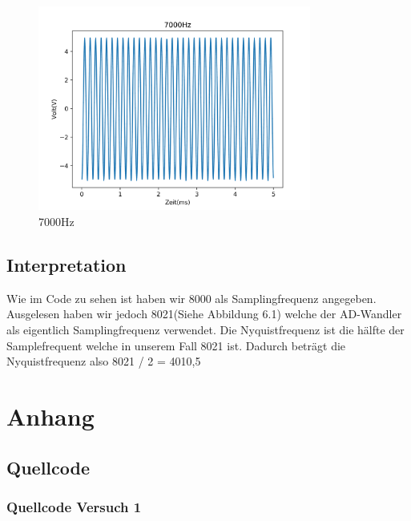 \documentclass[12pt, oneside, a4paper, \docLanguage]{report}
\begin{document}
\begin{figure}[H]
	\centering
	\includegraphics[width=0.8\textwidth]{../Images/7000Hz.png}
	\caption{7000Hz}
\end{figure}

\section{Interpretation}
\label{chap:VERSUCH_5_INTERPRETATION}
\begin{normalsize}
Wie im Code zu sehen ist haben wir 8000 als Samplingfrequenz angegeben. Ausgelesen haben wir jedoch 8021(Siehe Abbildung 6.1) welche der AD-Wandler als eigentlich Samplingfrequenz verwendet.
Die Nyquistfrequenz ist die hälfte der Samplefrequent welche in unserem Fall 8021 ist. Dadurch beträgt die Nyquistfrequenz also 8021 / 2 = 4010,5
\end{normalsize}
%
%
\renewcommand\thesection{A.\arabic{section}}
\renewcommand\thesubsection{\thesection.\arabic{subsection}}

\chapter*{Anhang}
\label{chap:APPENDIX}
\setcounter{chapter}{0}
\addtocounter{chapter}{1}
\setcounter{section}{0}

\section{Quellcode}
\label{chap:APPENDIX_SOURCECODE}

\subsection{Quellcode Versuch 1}
\label{chap:APPENDIX_SOURCECODE_V1}

\pagebreak

\pagebreak
\end{document}
